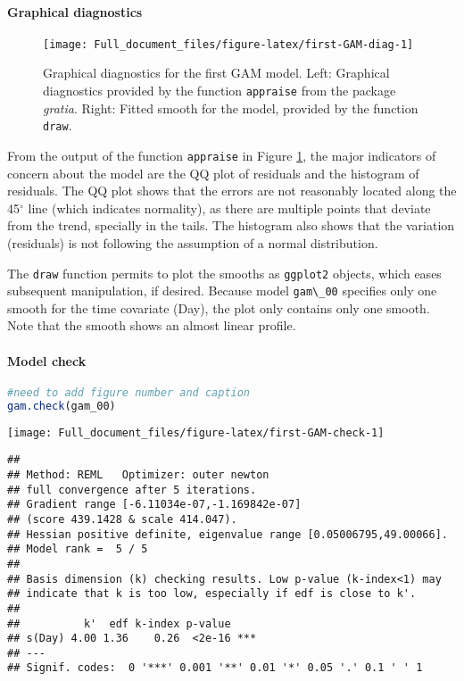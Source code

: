 \documentclass[
]{article}
\newcommand{\passthrough}[1]{#1}
\begin{document}
\hypertarget{graphical-diagnostics}{%
\paragraph{Graphical diagnostics}\label{graphical-diagnostics}}

\begin{figure}[H]

{\centering \texttt{[image: Full\_document\_files/figure-latex/first-GAM-diag-1]} 

}

\caption{Graphical diagnostics for the first GAM model. Left: Graphical diagnostics provided by the function \passthrough{\lstinline!appraise!} from the package \emph{gratia}. Right: Fitted smooth for the model, provided by the function \passthrough{\lstinline!draw!}.}\label{fig:first-GAM-diag}
\end{figure}

From the output of the function \passthrough{\lstinline!appraise!} in Figure \ref{fig:first-GAM-diag}, the major indicators of concern about the model are the QQ plot of residuals and the histogram of residuals. The QQ plot shows that the errors are not reasonably located along the 45\(^{\circ}\) line (which indicates normality), as there are multiple points that deviate from the trend, specially in the tails. The histogram also shows that the variation (residuals) is not following the assumption of a normal distribution.

The \passthrough{\lstinline!draw!} function permits to plot the smooths as \passthrough{\lstinline!ggplot2!} objects, which eases subsequent manipulation, if desired. Because model \passthrough{\lstinline!gam\_00!} specifies only one smooth for the time covariate (Day), the plot only contains only one smooth. Note that the smooth shows an almost linear profile.

\hypertarget{model-check}{%
\paragraph{Model check}\label{model-check}}

\begin{lstlisting}[language=R]
#need to add figure number and caption
gam.check(gam_00)
\end{lstlisting}

\texttt{[image: Full\_document\_files/figure-latex/first-GAM-check-1]}

\begin{lstlisting}
## 
## Method: REML   Optimizer: outer newton
## full convergence after 5 iterations.
## Gradient range [-6.11034e-07,-1.169842e-07]
## (score 439.1428 & scale 414.047).
## Hessian positive definite, eigenvalue range [0.05006795,49.00066].
## Model rank =  5 / 5 
## 
## Basis dimension (k) checking results. Low p-value (k-index<1) may
## indicate that k is too low, especially if edf is close to k'.
## 
##          k'  edf k-index p-value    
## s(Day) 4.00 1.36    0.26  <2e-16 ***
## ---
## Signif. codes:  0 '***' 0.001 '**' 0.01 '*' 0.05 '.' 0.1 ' ' 1
\end{lstlisting}
\end{document}
